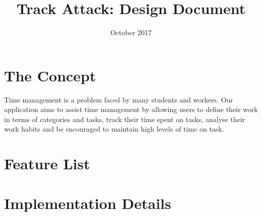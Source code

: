 \documentclass[12pt, a4paper]{article}
\author{}
\title{Track Attack: Design Document}
\date{October 2017}
\begin{document}
\maketitle

\section*{The Concept}
Time management is a problem faced by many students and workers. Our
application aims to assist time management by allowing users to define
their work in terms of categories and tasks, track their time spent on
tasks, analyse their work habits and be encouraged to maintain high
levels of time on task.

\section*{Feature List}




\section*{Implementation Details}
\end{document}
